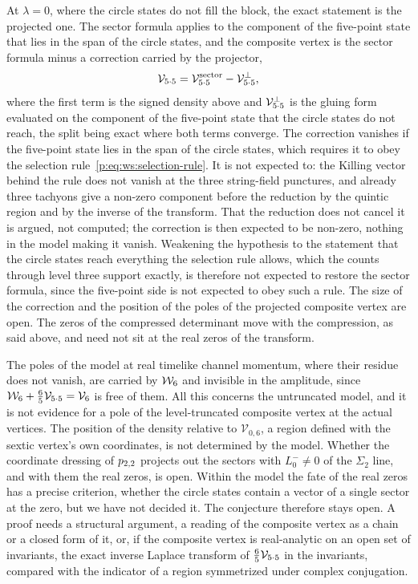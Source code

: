 At $\lambda = 0$, where the circle states do not fill the block, the exact statement is the projected one.
The sector formula applies to the component of the five-point state that lies in the span of the circle states, and the composite vertex is the sector formula minus a correction carried by the projector,
\begin{equation}
  \label{p:eq:ws:projected-composite}
  \mathcal{V}_{5 \cdot 5}
    = \mathcal{V}_{5 \cdot 5}^{\mathrm{sector}} - \mathcal{V}_{5 \cdot 5}^{\perp},
\end{equation}
where the first term is the signed density above and $\mathcal{V}_{5 \cdot 5}^{\perp}$ is the gluing form evaluated on the component of the five-point state that the circle states do not reach, the split being exact where both terms converge.
The correction vanishes if the five-point state lies in the span of the circle states, which requires it to obey the selection rule~\eqref{p:eq:ws:selection-rule}.
It is not expected to: the Killing vector behind the rule does not vanish at the three string-field punctures, and already three tachyons give a non-zero component before the reduction by the quintic region and by the inverse of the transform.
That the reduction does not cancel it is argued, not computed; the correction is then expected to be non-zero, nothing in the model making it vanish.
Weakening the hypothesis to the statement that the circle states reach everything the selection rule allows, which the counts through level three support exactly, is therefore not expected to restore the sector formula, since the five-point side is not expected to obey such a rule.
The size of the correction and the position of the poles of the projected composite vertex are open.
The zeros of the compressed determinant move with the compression, as said above, and need not sit at the real zeros of the transform.

The poles of the model at real timelike channel momentum, where their residue does not vanish, are carried by $\mathcal{W}_{6}$ and invisible in the amplitude, since $\mathcal{W}_{6} + \tfrac{6}{5} \mathcal{V}_{5 \cdot 5} = \mathcal{V}_{6}$ is free of them.
All this concerns the untruncated model, and it is not evidence for a pole of the level-truncated composite vertex at the actual vertices.
The position of the density relative to $\mathcal V_{0,6}$, a region defined with the sextic vertex's own coordinates, is not determined by the model.
Whether the coordinate dressing of $p_{2,2}$ projects out the sectors with $L_0^- \neq 0$ of the $\Sigma_2$ line, and with them the real zeros, is open.
Within the model the fate of the real zeros has a precise criterion, whether the circle states contain a vector of a single sector at the zero, but we have not decided it.
The conjecture therefore stays open.
A proof needs a structural argument, a reading of the composite vertex as a chain or a closed form of it, or, if the composite vertex is real-analytic on an open set of invariants, the exact inverse Laplace transform of $\tfrac{6}{5} \mathcal{V}_{5 \cdot 5}$ in the invariants, compared with the indicator of a region symmetrized under complex conjugation.

